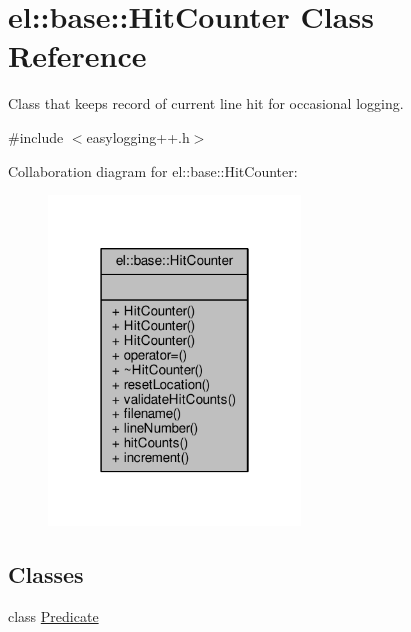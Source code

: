 \hypertarget{classel_1_1base_1_1HitCounter}{}\section{el\+:\+:base\+:\+:Hit\+Counter Class Reference}
\label{classel_1_1base_1_1HitCounter}


Class that keeps record of current line hit for occasional logging.  




{\ttfamily \#include $<$easylogging++.\+h$>$}



Collaboration diagram for el\+:\+:base\+:\+:Hit\+Counter\+:
\nopagebreak
\begin{figure}[H]
\begin{center}
\leavevmode
\includegraphics[width=190pt]{dc/d22/classel_1_1base_1_1HitCounter__coll__graph}
\end{center}
\end{figure}
\subsection*{Classes}
\begin{DoxyCompactItemize}
\item 
class \hyperlink{classel_1_1base_1_1HitCounter_1_1Predicate}{Predicate}
\end{DoxyCompactItemize}
